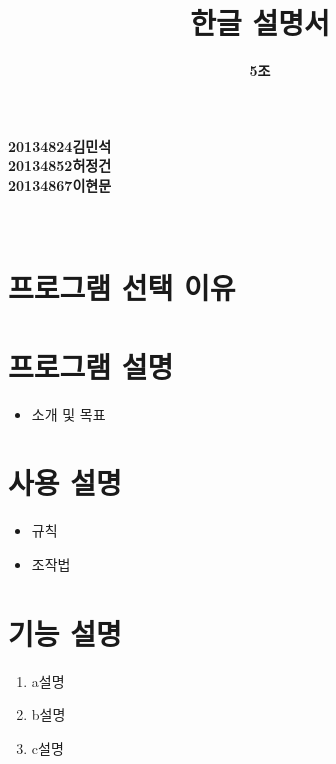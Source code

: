 \documentclass[a4paper, 11pt]{article}
\title{\textbf{\Huge오목 한글 설명서}}
\author{\textbf{\LARGE5조}}
\begin{document}
	
	\maketitle
	
	\vspace{6cm}
	\begin{center}
		\textbf{\large20134824김민석}\\
		\textbf{\large20134852허정건}\\
		\textbf{\large20134867이현문}\\
	\end{center}
	
	
	
	
	\maketitle
	\newpage
	\thispagestyle{empty}        
	\mbox{}
	
	\begin{center} 
		\textbf{}\\
	\end{center}
	\vspace{0.5cm}
	\section{프로그램 선택 이유}
	\vspace{0.5cm}
	\section{프로그램 설명}
	\begin{itemize}
		\item 소개 및 목표
	\end{itemize}
	
	\section{사용 설명}
		\begin{itemize}
		\item 규칙
		\item 조작법
	\end{itemize}

	
	\section{기능 설명}
	\begin{enumerate}
		\item a설명
		\item b설명
		\item c설명
	\end{enumerate}
	
\end{document}
